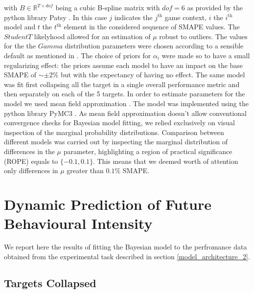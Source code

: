 with $B \in \mathbb{R}^{T \times dof}$ being a cubic B-spline matrix with $dof=6$ as provided by the python library Patsy \cite{patsy}. In this case $j$ indicates the $j^{\text{th}}$ game context, $i$ the $i^{\text{th}}$ model and $t$ the $t^{\text{th}}$ element in the considered sequence of SMAPE values. The $StudentT$ likelyhood allowed for an estimation of $\mu$ robust to outliers. The values for the the $Gamma$ distribution parameters were chosen according to a sensible default as mentioned in \cite{vehtarinu}. The choice of priors for $\alpha_{i}$ were made so to have a small regularizing effect: the priors assume each model to have an impact on the base SMAPE of $\sim \pm 2\% $ but with the expectancy of having no effect. The same model was fit first collapsing all the target in a single overall performance metric and then separately on each of the 5 targets. In order to estimate parameters for the model we used mean field approximation \cite{kucukelbir2017automatic}. The model was implemented using the python library PyMC3 \cite{salvatier2016probabilistic}. As mean field approximation doesn't allow conventional convergence checks for Bayesian model fitting, we relied exclusively on visual inspection of the marginal probability distributions. Comparison between different models was carried out by inspecting the marginal distribution of differences in the $\mu$ parameter, highlighting a region of practical significance (ROPE) equals to $\{-0.1, 0.1\}$. This means that we deemed worth of attention only differences in $\mu$ greater than $0.1\%$ SMAPE.

\section{Dynamic Prediction of Future Behavioural Intensity}
\label{dynamic_prediction_ancillary_perf}

We report here the results of fitting the Bayesian model to the perfromance data obtained from the experimental task described in section \ref{model_architecture_2}.

\subsection{Targets Collapsed}
\label{collapsed_bayes_2}

